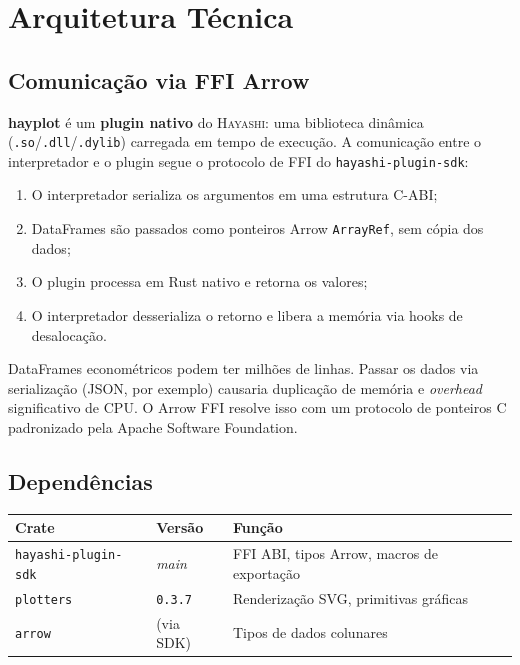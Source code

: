 \documentclass[12pt, a4paper, oneside]{book}
\newcommand{\code}[1]{\texttt{#1}}
\newcommand{\hayashi}{\textsc{Hayashi}}
\newcommand{\hayplot}{\textbf{hayplot}}
\begin{document}
\chapter{Arquitetura Técnica}

\section{Comunicação via FFI Arrow}

\hayplot{} é um \textbf{plugin nativo} do \hayashi{}: uma biblioteca dinâmica
(\code{.so}/\code{.dll}/\code{.dylib}) carregada em tempo de execução.
A comunicação entre o interpretador e o plugin segue o protocolo de
FFI do \code{hayashi-plugin-sdk}:

\begin{enumerate}
  \item O interpretador serializa os argumentos em uma estrutura C-ABI;
  \item DataFrames são passados como ponteiros Arrow \code{ArrayRef}, sem cópia dos dados;
  \item O plugin processa em Rust nativo e retorna os valores;
  \item O interpretador desserializa o retorno e libera a memória via hooks de desalocação.
\end{enumerate}

\begin{infobox}[title={\textbf{Nota:} Por que Zero-Copy?}]
  DataFrames econométricos podem ter milhões de linhas. Passar os dados
  via serialização (JSON, por exemplo) causaria duplicação de memória e
  \textit{overhead} significativo de CPU. O Arrow FFI resolve isso com um
  protocolo de ponteiros C padronizado pela Apache Software Foundation.
\end{infobox}

\section{Dependências}

\begin{center}
  \begin{tabular}{@{}llL{5cm}@{}}
    \toprule
    \textbf{Crate}             & \textbf{Versão} & \textbf{Função} \\
    \midrule
    \code{hayashi-plugin-sdk}  & \textit{main}   & FFI ABI, tipos Arrow, macros de exportação \\
    \code{plotters}            & \code{0.3.7}    & Renderização SVG, primitivas gráficas \\
    \code{arrow}               & (via SDK)       & Tipos de dados colunares \\
    \bottomrule
  \end{tabular}
\end{center}
\end{document}
